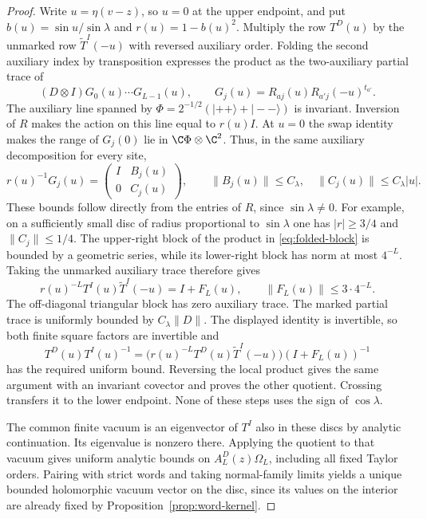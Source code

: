 \begin{proof}
Write $u=\eta(v-z)$, so $u=0$ at the upper endpoint, and put
$b(u)=\sin u/\sin\lambda$ and $r(u)=1-b(u)^2$.  Multiply the row
$T^D(u)$ by the unmarked row $\widetilde T^I(-u)$ with reversed
auxiliary order.  Folding the second auxiliary index by transposition
expresses the product as the two-auxiliary partial trace of
\[
 (D\otimes I)G_0(u)\cdots G_{L-1}(u),\qquad
 G_j(u)=R_{aj}(u)R_{a'j}(-u)^{t_{a'}}.
\]
The auxiliary line spanned by
$\Phi=2^{-1/2}(|++\rangle+|--\rangle)$ is invariant.  Inversion of
$R$ makes the action on this line equal to $r(u)I$.  At $u=0$ the
swap identity makes the range of $G_j(0)$ lie in
$\C\Phi\otimes\C^2$.  Thus, in the same auxiliary decomposition for
every site,
\begin{equation}\label{eq:folded-block}
 r(u)^{-1}G_j(u)=
 \begin{pmatrix}I&B_j(u)\\0&C_j(u)\end{pmatrix},\qquad
 \|B_j(u)\|\le C_\lambda,\quad
 \|C_j(u)\|\le C_\lambda|u|.
\end{equation}
These bounds follow directly from the entries of $R$, since
$\sin\lambda\ne0$.  For example, on a sufficiently small disc of
radius proportional to $\sin\lambda$ one has $|r|\ge3/4$ and
$\|C_j\|\le1/4$.  The upper-right block of the product in
\eqref{eq:folded-block} is bounded by a geometric series, while its
lower-right block has norm at most $4^{-L}$.  Taking the unmarked
auxiliary trace therefore gives
\[
 r(u)^{-L}T^I(u)\widetilde T^I(-u)=I+F_L(u),
 \qquad \|F_L(u)\|\le3\cdot4^{-L}.
\]
The off-diagonal triangular block has zero auxiliary trace.  The marked
partial trace is uniformly bounded by $C_\lambda\|D\|$.  The displayed
identity is invertible, so both finite square factors are invertible and
\[
 T^D(u)T^I(u)^{-1}
 =\bigl(r(u)^{-L}T^D(u)\widetilde T^I(-u)\bigr)(I+F_L(u))^{-1}
\]
has the required uniform bound.  Reversing the local product gives the
same argument with an invariant covector and proves the other quotient.
Crossing transfers it to the lower endpoint.  None of these steps uses
the sign of $\cos\lambda$.

The common finite vacuum is an eigenvector of $T^I$ also in these discs
by analytic continuation.  Its eigenvalue is nonzero there.  Applying
the quotient to that vacuum gives uniform analytic bounds on
$A_L^D(z)\Omega_L$, including all fixed Taylor orders.  Pairing with
strict words and taking normal-family limits yields a unique bounded
holomorphic vacuum vector on the disc, since its values on the interior
are already fixed by Proposition~\ref{prop:word-kernel}.


\end{proof}
